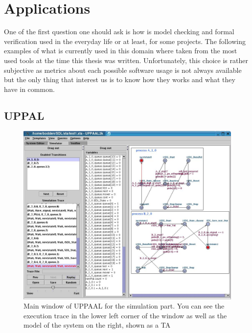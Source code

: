 \documentclass[12pt]{article}
\theoremstyle{definition}
\theoremstyle{definition}
\theoremstyle{remark}
\begin{document}

\section{Applications}


One of the first question one should ask is how is model checking and formal verification used in the everyday life or at least, for some projects. The following examples of what is currently used in this domain where taken from the most used tools at the time this thesis was written. Unfortunately, this choice is rather subjective as metrics about each possible software usage is not always available but the only thing that interest us is to know how they works and what they have in common.


\subsection{UPPAL}

\begin{figure}
    \centering
    \includegraphics[scale=0.3]{UPPAAL_trace.jpg}
    \caption{Main window of UPPAAL for the simulation part. You can see the execution trace in the lower left corner of the window as well as the model of the system on the right, shown as a TA}
    \label{UPPAAL}
\end{figure}
\end{document}
